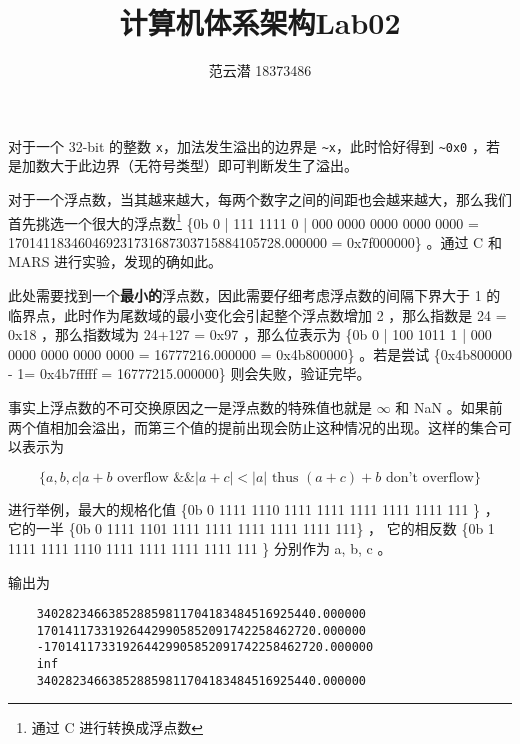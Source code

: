 \documentclass[lang=cn,11pt,a4paper,cite=authoryear]{elegantpaper}
\title{计算机体系架构\quad Lab02}
\author{范云潜 18373486}
\institute{微电子学院 184111 班}
\date{\zhtoday}
\begin{document}
\maketitle





对于一个 32-bit 的整数 \lstinline{x}，加法发生溢出的边界是 \lstinline{~x}，此时恰好得到 \lstinline{~0x0} ，若是加数大于此边界（无符号类型）即可判断发生了溢出。




对于一个浮点数，当其越来越大，每两个数字之间的间距也会越来越大，那么我们首先挑选一个很大的浮点数\footnote{通过 C 进行转换成浮点数} \{0b 0 | 111 1111 0 | 000 0000 0000 0000 0000 = 170141183460469231731687303715884105728.000000 = 0x7f000000\} 。通过 C 和 MARS 进行实验，发现的确如此。


此处需要找到一个\textbf{最小的}浮点数，因此需要仔细考虑浮点数的间隔下界大于 1 的临界点，此时作为尾数域的最小变化会引起整个浮点数增加 2 ，那么指数是 24 = 0x18 ，那么指数域为 24+127 = 0x97 ，那么位表示为 \{0b 0 | 100 1011 1 | 000 0000 0000 0000 0000 = 16777216.000000 = 0x4b800000\} 。若是尝试 \{0x4b800000 - 1= 0x4b7fffff = 16777215.000000\} 则会失败，验证完毕。


事实上浮点数的不可交换原因之一是浮点数的特殊值也就是 \(\infty\) 和 NaN 。如果前两个值相加会溢出，而第三个值的提前出现会防止这种情况的出现。这样的集合可以表示为

\[\{a, b, c | a + b \text{ overflow } \&\&  |a+c|< |a| \text{ thus } (a+c)+b \text{ don't overflow}\}\]

进行举例，最大的规格化值 \{0b 0 1111 1110 1111 1111 1111 1111 1111 111 \} ，它的一半 \{0b 0 1111 1101 1111 1111 1111 1111 1111 111\} ， 它的相反数  \{0b 1 1111 1111 1110 1111 1111 1111 1111 111 \} 分别作为 a, b, c 。



% 
输出为 

\begin{lstlisting}
    340282346638528859811704183484516925440.000000
    170141173319264429905852091742258462720.000000
    -170141173319264429905852091742258462720.000000
    inf
    340282346638528859811704183484516925440.000000    
\end{lstlisting}
   
\end{document}
